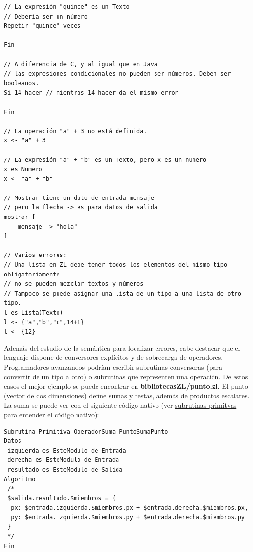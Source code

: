 \documentclass{report}
\begin{document}
	\begin{BVerbatim}
// La expresión "quince" es un Texto
// Debería ser un número
Repetir "quince" veces
	
Fin 

// A diferencia de C, y al igual que en Java
// las expresiones condicionales no pueden ser números. Deben ser booleanos.
Si 14 hacer // mientras 14 hacer da el mismo error

Fin

// La operación "a" + 3 no está definida.
x <- "a" + 3

// La expresión "a" + "b" es un Texto, pero x es un numero
x es Numero
x <- "a" + "b"

// Mostrar tiene un dato de entrada mensaje
// pero la flecha -> es para datos de salida
mostrar [
	mensaje -> "hola"
]

// Varios errores:
// Una lista en ZL debe tener todos los elementos del mismo tipo obligatoriamente
// no se pueden mezclar textos y números
// Tampoco se puede asignar una lista de un tipo a una lista de otro tipo.
l es Lista(Texto)
l <- {"a","b","c",14+1}
l <- {12}
	\end{BVerbatim} 
	
	\vspace{10px} 
	
	Además del estudio de la semántica para localizar errores, cabe destacar que el lenguaje dispone de conversores explícitos y de sobrecarga de operadores. Programadores avanzandos podrían escribir subrutinas conversoras (para convertir de un tipo a otro) o subrutinas que representen una operación. De estos casos el mejor ejemplo se puede encontrar en \textbf{bibliotecasZL/punto.zl}. El punto (vector de dos dimensiones) define sumas y restas, además de productos escalares. La suma se puede ver con el siguiente código nativo (ver \hyperref[subrutinasprimitivas]{subrutinas primitvas} para entender el código nativo):
	
	\vspace{10px}
	
	\begin{BVerbatim}
Subrutina Primitiva OperadorSuma PuntoSumaPunto
Datos
 izquierda es EsteModulo de Entrada 
 derecha es EsteModulo de Entrada
 resultado es EsteModulo de Salida
Algoritmo
 /*
 $salida.resultado.$miembros = {
  px: $entrada.izquierda.$miembros.px + $entrada.derecha.$miembros.px,
  py: $entrada.izquierda.$miembros.py + $entrada.derecha.$miembros.py
 }
 */
Fin
	\end{BVerbatim}
	
\end{document}
